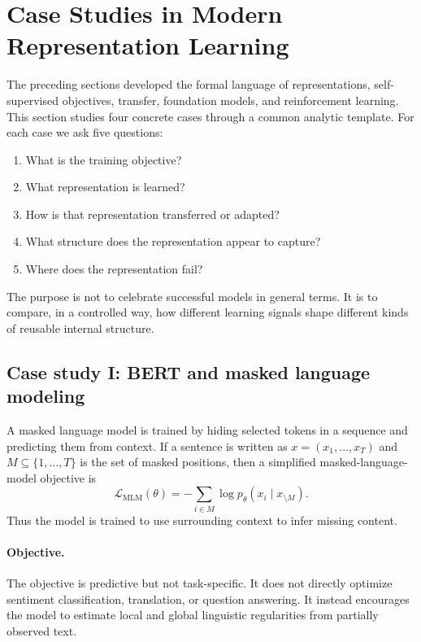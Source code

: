 \section{Case Studies in Modern Representation Learning}

The preceding sections developed the formal language of representations, self-supervised objectives, transfer, foundation models, and reinforcement learning.
This section studies four concrete cases through a common analytic template.
For each case we ask five questions:
\begin{enumerate}
    \item What is the training objective?
    \item What representation is learned?
    \item How is that representation transferred or adapted?
    \item What structure does the representation appear to capture?
    \item Where does the representation fail?
\end{enumerate}

\medskip

\noindent
The purpose is not to celebrate successful models in general terms.
It is to compare, in a controlled way, how different learning signals shape different kinds of reusable internal structure.

\subsection*{Case study I: BERT and masked language modeling}

A masked language model is trained by hiding selected tokens in a sequence and predicting them from context.
If a sentence is written as $x=(x_1,\dots,x_T)$ and $M\subseteq\{1,\dots,T\}$ is the set of masked positions, then a simplified masked-language-model objective is
\[
\mathcal{L}_{\mathrm{MLM}}(\theta)
=
-\sum_{i\in M} \log p_\theta(x_i\mid x_{\setminus M}).
\]
Thus the model is trained to use surrounding context to infer missing content.

\paragraph{Objective.}
The objective is predictive but not task-specific.
It does not directly optimize sentiment classification, translation, or question answering.
It instead encourages the model to estimate local and global linguistic regularities from partially observed text.

